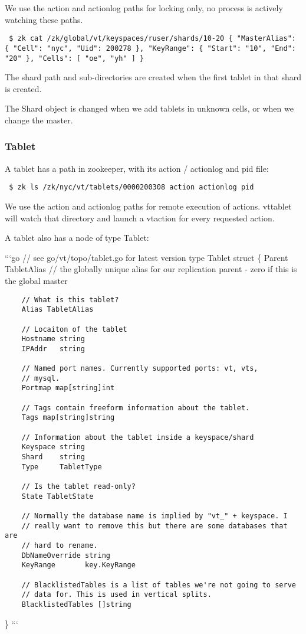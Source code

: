 We use the action and actionlog paths for locking only, no process is actively watching these paths.

{\tt 
\$ zk cat /zk/global/vt/keyspaces/ruser/shards/10-20
\{
  "MasterAlias": \{
    "Cell": "nyc",
    "Uid": 200278
  \},
  "KeyRange": \{
    "Start": "10",
    "End": "20"
  \},
 "Cells": [
    "oe",
    "yh"
 ]
\}
}

The shard path and sub-directories are created when the first tablet in that shard is created.

The Shard object is changed when we add tablets in unknown cells, or when we change the master.

\subsubsection{Tablet}\hypertarget{tablet}{}\label{tablet}

A tablet has a path in zookeeper, with its action / actionlog and pid file:

{\tt 
\$ zk ls /zk/nyc/vt/tablets/0000200308
action
actionlog
pid
}

We use the action and actionlog paths for remote execution of actions. vttablet will watch that directory and launch a vtaction for every requested action.

A tablet also has a node of type Tablet:

```go
// see go/vt/topo/tablet.go for latest version
type Tablet struct \{
        Parent      TabletAlias // the globally unique alias for our replication parent - zero if this is the global master

\begin{verbatim}    // What is this tablet?
    Alias TabletAlias

    // Locaiton of the tablet
    Hostname string
    IPAddr   string

    // Named port names. Currently supported ports: vt, vts,
    // mysql.
    Portmap map[string]int

    // Tags contain freeform information about the tablet.
    Tags map[string]string

    // Information about the tablet inside a keyspace/shard
    Keyspace string
    Shard    string
    Type     TabletType

    // Is the tablet read-only?
    State TabletState

    // Normally the database name is implied by "vt_" + keyspace. I
    // really want to remove this but there are some databases that are
    // hard to rename.
    DbNameOverride string
    KeyRange       key.KeyRange
    
    // BlacklistedTables is a list of tables we're not going to serve
    // data for. This is used in vertical splits.
    BlacklistedTables []string
\end{verbatim}
\}
```

